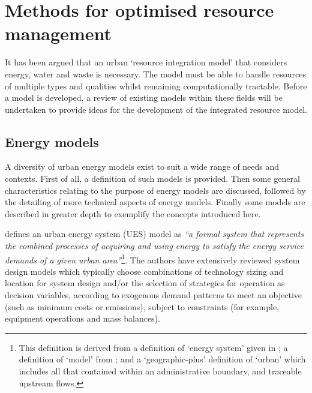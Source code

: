 \section{Methods for optimised resource management} \label{sec:methods}
It has been argued that an urban `resource integration model' that considers energy, water and waste is necessary. The model must be able to handle resources of multiple types and qualities whilst remaining computationally tractable. Before a model is developed, a review of existing models within these fields will be undertaken to provide ideas for the development of the integrated resource model.

\subsection{Energy models} \label{sec:models_energy}
A diversity of urban energy models exist to suit a wide range of needs and contexts. First of all, a definition of such models is provided. Then some general characteristics relating to the purpose of energy models are discussed, followed by the detailing of more technical aspects of energy models. Finally some models are described in greater depth to exemplify the concepts introduced here.

\citet{Keirstead2012b} defines an urban energy system (UES) model as \emph{``a formal system that represents the combined processes of acquiring and using energy to satisfy the energy service demands of a given urban area''}\footnote{This definition is derived from a definition of `energy system' given in \citet{Jaccard2005}; a definition of `model' from \citet{Rosen2000}; and a `geographic-plus' definition of `urban' which includes all that contained within an administrative boundary, and traceable upstream flows.}. The authors have extensively reviewed system design models which typically choose combinations of technology sizing and location for system design and/or the selection of strategies for operation as decision variables, according to exogenous demand patterns to meet an objective (such as minimum costs or emissions), subject to constraints (for example, equipment operations and mass balances). 

